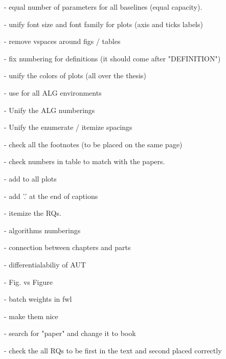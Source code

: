  - equal number of parameters for all baselines (equal capacity).

 - unify font size and font family for plots (axis and ticks labels)

 - remove vspaces around figs / tables
 
 - fix numbering for definitions (it should come after "DEFINITION")
 
 - unify the colors of plots (all over the thesis)
 
 - use \small for all ALG environments
 
 - Unify the ALG numberings
 
 - Unify the enumerate / itemize spacings
 
 - check all the footnotes (to be placed on the same page)
 
 - check numbers in table to match with the papers.
 
 - add \selectfont to all plots
 
 - add '.' at the end of captions
 
 - itemize the RQs.
 
 - algorithms numberings
 
 - connection between chapters and parts
 
 - differentialabiliy of AUT
 
 - Fig. vs Figure
 
 - batch weights in fwl
 
 - \url{} make them nice
 
 - search for "paper" and change it to book
 
 - check the all RQs to be first in the text and second placed correctly